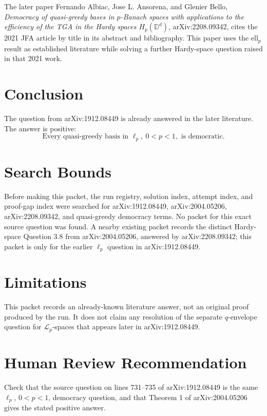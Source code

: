 \documentclass[11pt]{article}
\begin{document}
The later paper Fernando Albiac, Jose L. Ansorena, and Glenier Bello,
\emph{Democracy of quasi-greedy bases in \(p\)-Banach spaces with applications
to the efficiency of the TGA in the Hardy spaces \(H_p(\mathbb D^d)\)},
arXiv:2208.09342, cites the 2021 JFA article by title in its abstract and
bibliography. This paper uses the ell\(_p\) result as established literature
while solving a further Hardy-space question raised in that 2021 work.

\section*{Conclusion}

The question from arXiv:1912.08449 is already answered in the later
literature. The answer is positive:
\[
\boxed{\text{Every quasi-greedy basis in }\ell_p,\ 0<p<1,\text{ is democratic.}}
\]

\section*{Search Bounds}

Before making this packet, the run registry, solution index, attempt index,
and proof-gap index were searched for arXiv:1912.08449, arXiv:2004.05206,
arXiv:2208.09342, and quasi-greedy democracy terms. No packet for this exact
source question was found. A nearby existing packet records the distinct
Hardy-space Question 3.8 from arXiv:2004.05206, answered by arXiv:2208.09342;
this packet is only for the earlier \(\ell_p\) question in arXiv:1912.08449.

\section*{Limitations}

This packet records an already-known literature answer, not an original proof
produced by the run. It does not claim any resolution of the separate
\(q\)-envelope question for \(\mathcal L_p\)-spaces that appears later in
arXiv:1912.08449.

\section*{Human Review Recommendation}

Check that the source question on lines 731--735 of arXiv:1912.08449 is the
same \(\ell_p\), \(0<p<1\), democracy question, and that Theorem 1 of
arXiv:2004.05206 gives the stated positive answer.
\end{document}
